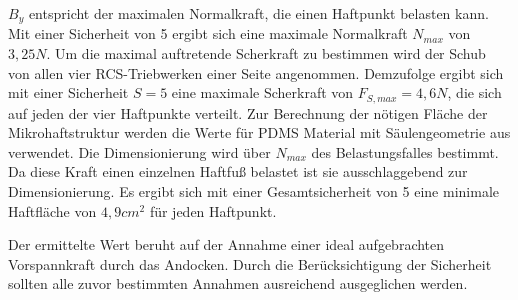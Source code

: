 $B_y$ entspricht der maximalen Normalkraft, die einen Haftpunkt belasten kann. Mit einer Sicherheit von 5 ergibt sich eine maximale Normalkraft $N_{max}$ von $3,25 N$. Um die maximal auftretende Scherkraft zu bestimmen wird der Schub von allen vier RCS-Triebwerken einer Seite angenommen. Demzufolge ergibt sich mit einer Sicherheit $S = 5$ eine maximale Scherkraft von $F_{S, max} = 4,6 N$, die sich auf jeden der vier Haftpunkte verteilt. Zur Berechnung der nötigen Fläche der Mikrohaftstruktur werden die Werte für PDMS Material mit Säulengeometrie aus \cite[Tabelle1, Seite 23]{Schwerter.} verwendet. Die Dimensionierung wird über $N_{max}$ des Belastungsfalles bestimmt. Da diese Kraft einen einzelnen Haftfuß belastet ist sie ausschlaggebend zur Dimensionierung. Es ergibt sich mit einer Gesamtsicherheit von 5 eine minimale Haftfläche von $4,9 cm^{2}$ für jeden Haftpunkt.

Der ermittelte Wert beruht auf der Annahme einer ideal aufgebrachten Vorspannkraft durch das Andocken. Durch die Berücksichtigung der Sicherheit sollten alle zuvor bestimmten Annahmen ausreichend ausgeglichen werden. 




		

